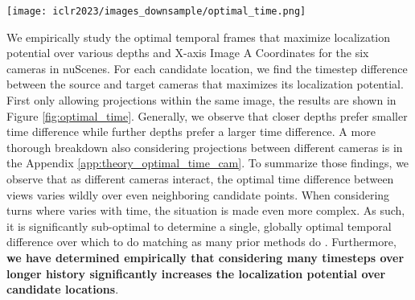 \documentclass[runningheads, hyperfootnotes=false]{article}
\begin{document}
\begin{figure*}[t]
  \centering
  \texttt{[image: iclr2023/images\_downsample/optimal\_time.png]}
  \captionsetup{aboveskip=0pt}\captionsetup{belowskip=0pt}\caption{Optimal time difference over candidate locations. White regions indicate that there is no valid projection. }
  \label{fig:optimal_time}
\end{figure*} We empirically study the optimal temporal frames that maximize localization potential over various depths and X-axis Image A Coordinates for the six cameras in nuScenes. For each candidate location, we find the timestep difference between the source and target cameras that maximizes its localization potential. First only allowing projections within the same image, the results are shown in Figure \ref{fig:optimal_time}. Generally, we observe that closer depths prefer smaller time difference while further depths prefer a larger time difference. A more thorough breakdown also considering projections between different cameras is in the Appendix \ref{app:theory_optimal_time_cam}. To summarize those findings, we observe that as different cameras interact, the optimal time difference between views varies wildly over even neighboring candidate points. When considering turns where  varies with time, the situation is made even more complex. As such, it is significantly sub-optimal to determine a single, globally optimal temporal difference over which to do matching as many prior methods do \citep{huang2021bevdet,liu2022petrv2}. Furthermore, \textbf{we have determined empirically that considering many timesteps over longer history significantly increases the localization potential over candidate locations}.
\end{document}
